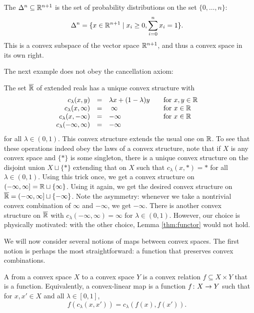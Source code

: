 \documentclass[12pt, reqno]{amsart}
\newcommand{\extreal}{\overline{\real}}
\begin{document}
\begin{example}
\label{ex:simplex}
    The  $\Delta^n \subseteq \mathbb{R}^{n+1}$ is the set of probability distributions on the set $\{0,\dots, n\}$:
    \[\Delta^n = \{x \in \mathbb{R}^{n+1} \mid x_i \geq 0, \sum_{i=0}^n x_i = 1\} .\]
    This is a convex subspace of the vector space $\mathbb{R}^{n+1}$, and thus a convex space in its own right.
\end{example}

The next example does not obey the cancellation axiom:

\begin{example} \label{ex:extended_reals}
    The set $\extreal$ of extended reals has a unique convex structure with
    \[ 
    \begin{array}{rclll}
        c_\lambda(x,y) &=& \lambda x + (1-\lambda) y &&\text{for $x,y \in \mathbb{R}$} \\ c_\lambda(x,\infty)
        &=& \; \infty &&\text{for $x \in \mathbb{R}$} \\
        c_\lambda(x,-\infty) &=& -\infty &&\text{for $x \in \mathbb{R}$} \\
        c_\lambda(-\infty, \infty) &=& -\infty 
    \end{array}
    \]
    for all $\lambda \in (0,1)$. This convex structure extends the usual one on $\mathbb{R}$. To see that these operations indeed obey the laws of a convex structure, note that if $X$ is any convex space and $\{\ast\}$ is some singleton, there is a unique convex structure on the disjoint union $X \sqcup \{\ast\}$ extending that on $X$ such that $c_\lambda(x,\ast) = \ast$ for all $\lambda \in (0,1)$. Using this trick once, we get a convex structure on $(-\infty,\infty] = \mathbb{R} \sqcup \{\infty\}$. Using it again, we get the desired convex structure on $\extreal = (-\infty,\infty] \sqcup \{-\infty\}$. Note the asymmetry: whenever we take a nontrivial convex combination of $\infty$ and $-\infty$, we get $-\infty$. There is another convex structure on $\extreal$ with $c_\lambda(-\infty, \infty) = \infty$ for $\lambda \in (0,1)$. However, our choice is physically motivated: with the other choice, Lemma \ref{thm:functor} would not hold.
\end{example}

We will now consider several notions of maps between convex spaces. The first notion is perhaps the most straightforward: a function that preserves convex combinations.

\begin{definition}
    A  from a convex space $X$ to a convex space $Y$ is a convex relation $f \subseteq X \times Y$ that is a function.
    Equivalently, a convex-linear map is a function $f \colon X \rightarrow Y$ such that for $x, x' \in X$ and all $\lambda \in [0,1]$, 
    \[   f(c_\lambda(x,x')) = c_\lambda(f(x), f(x')).\]
\end{definition}
\end{document}

